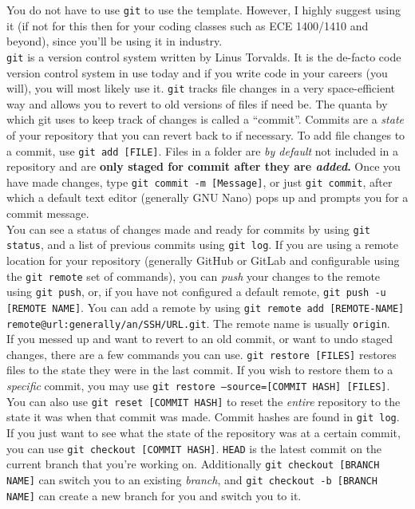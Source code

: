 \documentclass[a4paper,10pt]{article}
\begin{document}
You do not have to use \texttt{git} to use the template. However, I highly suggest using it (if not for this then for your coding classes such as ECE 1400/1410 and beyond), since you'll be using it in industry.
\\[10pt]
\texttt{git} is a version control system written by Linus Torvalds. It is the de-facto code version control system in use today and if you write code in your careers (you will), you will most likely use it. \texttt{git} tracks file changes in a very space-efficient way and allows you to revert to old versions of files if need be. The quanta by which git uses to keep track of changes is called a ``commit''. Commits are a \emph{state} of your repository that you can revert back to if necessary. To add file changes to a commit, use \texttt{git add [FILE]}. Files in a folder are \emph{by default} not included in a repository and are \textbf{only staged for commit after they are \emph{added}.} Once you have made changes, type \texttt{git commit -m [Message]}, or just \texttt{git commit}, after which a default text editor (generally GNU Nano) pops up and prompts you for a commit message.
\\[10pt]
You can see a status of changes made and ready for commits by using \texttt{git status}, and a list of previous commits using \texttt{git log}. If you are using a remote location for your repository (generally GitHub or GitLab and configurable using the \texttt{git remote} set of commands), you can \emph{push} your changes to the remote using \texttt{git push}, or, if you have not configured a default remote, \texttt{git push -u [REMOTE NAME]}. You can add a remote by using \texttt{git remote add [REMOTE-NAME] remote@url:generally/an/SSH/URL.git}. The remote name is usually \texttt{origin}.
\\[10pt]
If you messed up and want to revert to an old commit, or want to undo staged changes, there are a few commands you can use. \texttt{git restore [FILES]} restores files to the state they were in the last commit. If you wish to restore them to a \emph{specific} commit, you may use \texttt{git restore --source=[COMMIT HASH] [FILES]}. You can also use \texttt{git reset [COMMIT HASH]} to reset the \emph{entire} repository to the state it was when that commit was made. Commit hashes are found in \texttt{git log}.
\\[10pt]
If you just want to see what the state of the repository was at a certain commit, you can use \texttt{git checkout [COMMIT HASH]}. \texttt{HEAD} is the latest commit on the current branch that you're working on. Additionally \texttt{git checkout [BRANCH NAME]} can switch you to an existing \emph{branch}, and \texttt{git checkout -b [BRANCH NAME]} can create a new branch for you and switch you to it.
\end{document}
